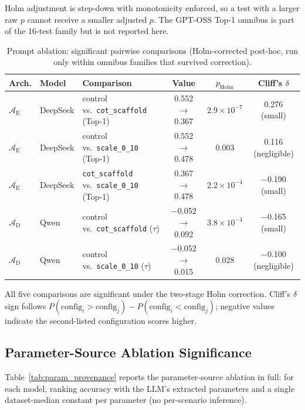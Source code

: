 \documentclass[11pt]{article}
\begin{document}
Holm adjustment is step-down with monotonicity enforced, so a test with a larger raw $p$ cannot receive a smaller adjusted $p$. The GPT-OSS Top-1 omnibus is part of the 16-test family but is not reported here.

\begin{table}[htbp]
\centering
\small
\centering
\renewcommand{\arraystretch}{1.10}
\caption{Prompt ablation: significant pairwise comparisons (Holm-corrected post-hoc, run only within omnibus families that survived correction).}
\label{tab:prompt_pairwise}
\begin{tabular}{@{}ll l ccc@{}}
\toprule
Arch. & Model & Comparison & Value & $p_{\text{Holm}}$ & Cliff's $\delta$ \\
\midrule
$\mathcal{A}_{\text{E}}$ & DeepSeek & control vs.\ \texttt{cot\_scaffold} (Top-1) & 0.552 $\to$ 0.367 & $2.9\times10^{-7}$ & 0.276 (small) \\
$\mathcal{A}_{\text{E}}$ & DeepSeek & control vs.\ \texttt{scale\_0\_10} (Top-1) & 0.552 $\to$ 0.478 & 0.003 & 0.116 (negligible) \\
$\mathcal{A}_{\text{E}}$ & DeepSeek & \texttt{cot\_scaffold} vs.\ \texttt{scale\_0\_10} (Top-1) & 0.367 $\to$ 0.478 & $2.2\times10^{-4}$ & $-$0.190 (small) \\
$\mathcal{A}_{\text{D}}$ & Qwen & control vs.\ \texttt{cot\_scaffold} ($\tau$) & $-$0.052 $\to$ 0.092 & $3.8\times10^{-4}$ & $-$0.165 (small) \\
$\mathcal{A}_{\text{D}}$ & Qwen & control vs.\ \texttt{scale\_0\_10} ($\tau$) & $-$0.052 $\to$ 0.015 & 0.028 & $-$0.100 (negligible) \\
\bottomrule
\end{tabular}
\renewcommand{\arraystretch}{1.0}
\end{table}

All five comparisons are significant under the two-stage Holm correction. Cliff's $\delta$ sign follows $P(\text{config}_i > \text{config}_j) - P(\text{config}_i < \text{config}_j)$; negative values indicate the second-listed configuration scores higher.

\subsection{Parameter-Source Ablation Significance}
\label{app:paramprov-significance}

Table~\ref{tab:param_provenance} reports the parameter-source ablation in full: for each model, ranking accuracy with the LLM's extracted parameters and a single dataset-median constant per parameter (no per-scenario inference).
\end{document}
